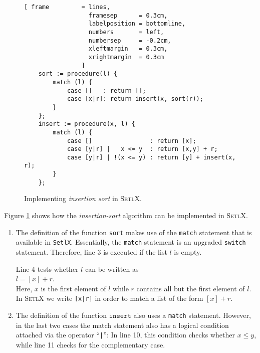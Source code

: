 \begin{figure}[!ht]
  \centering
\begin{Verbatim}[ frame         = lines, 
                  framesep      = 0.3cm, 
                  labelposition = bottomline,
                  numbers       = left,
                  numbersep     = -0.2cm,
                  xleftmargin   = 0.3cm,
                  xrightmargin  = 0.3cm
                ]
    sort := procedure(l) {
        match (l) {
            case []   : return [];
            case [x|r]: return insert(x, sort(r));
        }
    };
    insert := procedure(x, l) {
        match (l) {
            case []                : return [x];
            case [y|r] |   x <= y  : return [x,y] + r;
            case [y|r] | !(x <= y) : return [y] + insert(x, r);
        }
    };
\end{Verbatim}
\vspace*{-0.3cm}
  \caption{Implementing \emph{insertion sort} in \textsc{SetlX}.}
  \label{fig:insertion-sort.stlx}
\end{figure} 

\noindent
Figure \ref{fig:insertion-sort.stlx} shows how the \emph{insertion-sort} algorithm can be implemented 
in \textsc{SetlX}.
\begin{enumerate}
\item The definition of the function \texttt{sort} makes use of the \texttt{match} statement
      that is available in \texttt{SetlX}.  Essentially, the \texttt{match} statement is an upgraded
      \texttt{switch} statement.  Therefore, line 3 is executed if the list $l$ is empty.

      Line 4 tests whether $l$ can be written as  
      \\[0.2cm]
      \hspace*{1.3cm}
      $l = [ x ] + r$.
      \\[0.2cm]
      Here, $x$ is the first element of $l$ while $r$ contains all but the first element of $l$.  
      In \textsc{SetlX} we write \texttt{[x|r]} in order to match a list of the form $[x] + r$.
\item The definition of the function $\mathtt{insert}$ also uses a 
      \texttt{match} statement.  However, in the last two cases the match statement
      also has a logical condition attached via the operator ``\texttt{|}'':
      In line 10, this condition checks whether $x \leq y$, while line 11 checks for the
      complementary case.
\end{enumerate}

